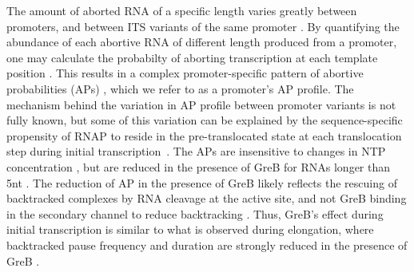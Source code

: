 The amount of aborted RNA of a specific length varies greatly between
promoters, and between ITS variants of the same promoter
\cite{hsu_promoter_2002}. By quantifying the abundance of each abortive RNA of
different length produced from a promoter, one may calculate the probabilty of
aborting transcription at each template position \cite{hsu_quantitative_1996}.
This results in a complex promoter-specific pattern of abortive probabilities
(APs) \cite{hsu_initial_2006,hsu_vitro_2003}, which we refer to as a
promoter's AP profile. The mechanism behind the variation in AP profile
between promoter variants is not fully known, but some of this variation can
be explained by the sequence-specific propensity of RNAP to reside in the
pre-translocated state at each translocation step during initial
transcription~\cite{skancke_sequence-dependent_2015}. The APs are insensitive
to changes in NTP concentration \cite{hsu_vitro_2003}, but are reduced in the
presence of GreB for RNAs longer than 5nt \cite{hsu_initial_2006}. The
reduction of AP in the presence of GreB likely reflects the rescuing of
backtracked complexes by RNA cleavage at the active site, and not GreB binding
in the secondary channel to reduce backtracking \cite{opalka_structure_2003,
hsu_initial_2006}. Thus, GreB's effect during initial transcription is similar
to what is observed during elongation, where backtracked pause frequency and
duration are strongly reduced in the presence of GreB
\cite{shaevitz_backtracking_2003}.


